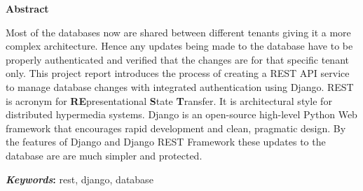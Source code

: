 \thispagestyle{empty} 
\vspace{1.0in}
\centerline{\Large{\bf Abstract}}
\vspace{.77cm}

Most of the databases now are shared between different tenants giving it a more
complex architecture. Hence any updates being made to the database have to be
properly authenticated and verified that the changes are for that specific
tenant only. This project report introduces the process of creating a REST API
service to manage database changes with integrated authentication using Django.
REST is acronym for {\bf{RE}}presentational {\bf{S}}tate {\bf{T}}ransfer.
It is architectural style for distributed hypermedia systems. Django is an
open-source high-level Python Web framework that encourages rapid development
and clean, pragmatic design. By the features of Django and Django REST
Framework these updates to the database are are much simpler and protected.

\noindent\textbf{\textit{Keywords}:} rest, django, database
\begin{center}
\end{center}

\vspace{.3cm}

%

